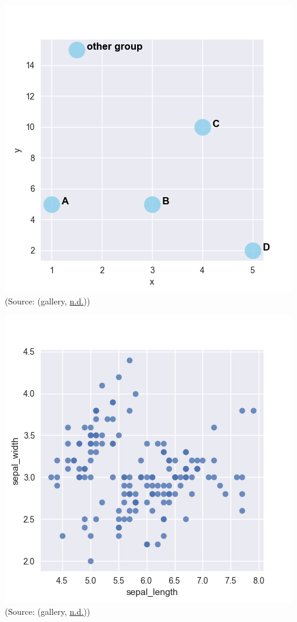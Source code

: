 \documentclass[]{book}
\begin{document}
\includegraphics{images/scatterplot_bigdot.png}
(Source: (gallery, \protect\hyperlink{ref-The_python_graph_gallery_scatter_plot}{n.d.}))

\includegraphics{images/scatterplot_smalldot.png}
(Source: (gallery, \protect\hyperlink{ref-The_python_graph_gallery_scatter_plot}{n.d.}))
\end{document}
